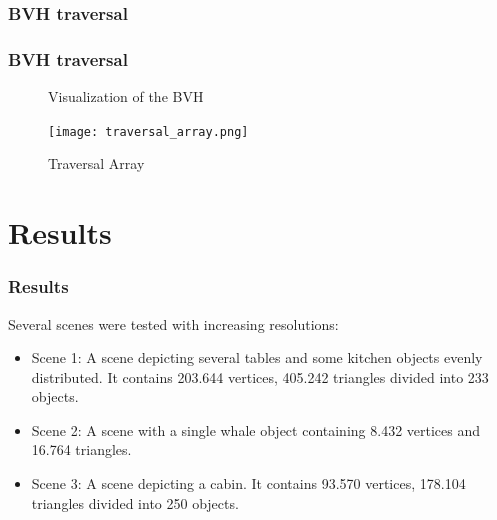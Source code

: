 \documentclass{beamer}
\begin{document}
\subsubsection{BVH traversal}
\begin{frame}
  \frametitle{BVH traversal}
\begin{figure}
\centering


\caption{Visualization of the BVH}
\label{fig:bvh}
\end{figure}

\begin{figure}
\centering
\texttt{[image: traversal\_array.png]}
\caption{Traversal Array}
\label{fig:traversal}
\end{figure}


\end{frame}



\section{Results}
\begin{frame}
  \frametitle{Results}

Several scenes were tested with increasing resolutions:
\begin{itemize}
\item Scene 1: A scene depicting several tables and some kitchen
  objects evenly distributed. It contains 203.644 vertices, 405.242
  triangles divided into 233 objects.
\item Scene 2: A scene with a single whale object containing 8.432
  vertices and 16.764 triangles.
\item Scene 3: A scene depicting a cabin. It contains 93.570 vertices,
  178.104 triangles divided into 250 objects.
\end{itemize}
\end{frame}
\end{document}
